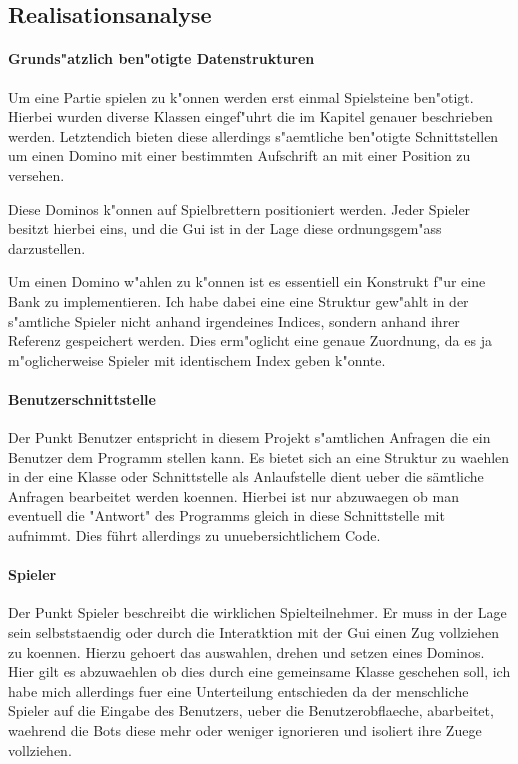 \subsection{Realisationsanalyse}
\paragraph{Grunds"atzlich ben"otigte Datenstrukturen}
Um eine Partie spielen zu k"onnen werden erst einmal Spielsteine ben"otigt. Hierbei wurden diverse Klassen eingef"uhrt die im Kapitel 
genauer beschrieben werden. Letztendich bieten diese allerdings s"aemtliche ben"otigte Schnittstellen um einen Domino mit einer bestimmten Aufschrift an mit einer Position zu versehen. 

Diese Dominos k"onnen auf Spielbrettern positioniert werden. Jeder Spieler besitzt hierbei eins, und die Gui ist in der Lage diese ordnungsgem"ass darzustellen. 

Um einen Domino w"ahlen zu k"onnen ist es essentiell ein Konstrukt f"ur eine Bank zu implementieren. Ich habe dabei eine eine Struktur gew"ahlt in der s"amtliche Spieler nicht anhand irgendeines Indices, sondern anhand ihrer Referenz gespeichert werden. Dies erm"oglicht eine genaue Zuordnung, da es ja m"oglicherweise Spieler mit identischem Index geben k"onnte. 

\paragraph{Benutzerschnittstelle}
Der Punkt Benutzer entspricht in diesem Projekt s"amtlichen Anfragen die ein Benutzer dem Programm stellen kann. Es bietet sich an eine Struktur zu waehlen in der eine Klasse oder Schnittstelle als Anlaufstelle dient ueber die sämtliche Anfragen bearbeitet werden koennen. Hierbei ist nur abzuwaegen ob man eventuell die "Antwort" des Programms gleich in diese
 Schnittstelle mit aufnimmt. Dies führt allerdings zu unuebersichtlichem Code. 

\paragraph{Spieler}
Der Punkt Spieler beschreibt die wirklichen Spielteilnehmer. Er muss in der Lage sein selbststaendig oder durch die Interatktion mit der Gui einen Zug vollziehen zu koennen. Hierzu gehoert das auswahlen, drehen und setzen eines Dominos. Hier gilt es abzuwaehlen ob dies durch eine gemeinsame Klasse geschehen soll, ich habe mich allerdings fuer eine Unterteilung entschieden da der menschliche Spieler auf die Eingabe des Benutzers, ueber die Benutzerobflaeche, abarbeitet, waehrend die Bots diese mehr oder weniger ignorieren und isoliert ihre Zuege vollziehen. 


